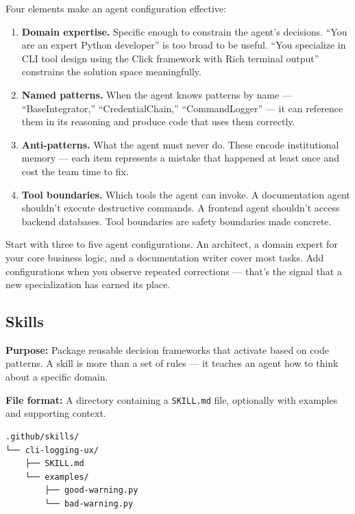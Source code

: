 \documentclass[
  a4paper,
  DIV=11,
  numbers=noendperiod]{scrreprt}
\providecommand{\tightlist}{%
  \setlength{\itemsep}{0pt}\setlength{\parskip}{0pt}}
\begin{document}
Four elements make an agent configuration effective:

\begin{enumerate}
\def\labelenumi{\arabic{enumi}.}
\tightlist
\item
  \textbf{Domain expertise.} Specific enough to constrain the agent's
  decisions. ``You are an expert Python developer'' is too broad to be
  useful. ``You specialize in CLI tool design using the Click framework
  with Rich terminal output'' constrains the solution space
  meaningfully.
\item
  \textbf{Named patterns.} When the agent knows patterns by name ---
  ``BaseIntegrator,'' ``CredentialChain,'' ``CommandLogger'' --- it can
  reference them in its reasoning and produce code that uses them
  correctly.
\item
  \textbf{Anti-patterns.} What the agent must never do. These encode
  institutional memory --- each item represents a mistake that happened
  at least once and cost the team time to fix.
\item
  \textbf{Tool boundaries.} Which tools the agent can invoke. A
  documentation agent shouldn't execute destructive commands. A frontend
  agent shouldn't access backend databases. Tool boundaries are safety
  boundaries made concrete.
\end{enumerate}

Start with three to five agent configurations. An architect, a domain
expert for your core business logic, and a documentation writer cover
most tasks. Add configurations when you observe repeated corrections ---
that's the signal that a new specialization has earned its place.

\subsection{Skills}\label{skills}

\textbf{Purpose:} Package reusable decision frameworks that activate
based on code patterns. A skill is more than a set of rules --- it
teaches an agent how to think about a specific domain.

\textbf{File format:} A directory containing a \texttt{SKILL.md} file,
optionally with examples and supporting context.

\begin{verbatim}
.github/skills/
└── cli-logging-ux/
    ├── SKILL.md
    └── examples/
        ├── good-warning.py
        └── bad-warning.py
\end{verbatim}
\end{document}
